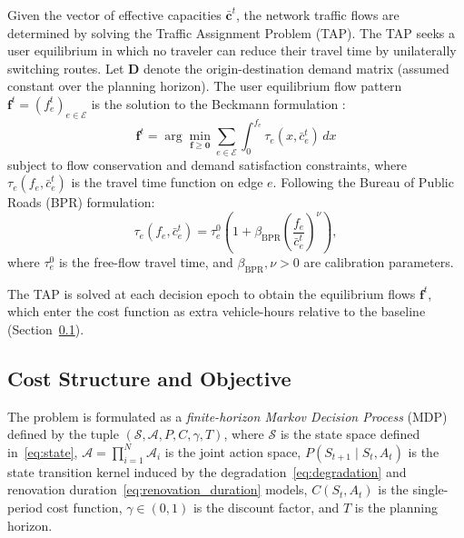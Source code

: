 \documentclass[3p, twocolumn]{elsarticle}
\begin{document}
Given the vector of effective capacities $\bar{\mathbf{c}}^t$, the network traffic flows are determined by solving the Traffic Assignment Problem (TAP). The TAP seeks a user equilibrium in which no traveler can reduce their travel time by unilaterally switching routes. Let $\mathbf{D}$ denote the origin-destination demand matrix (assumed constant over the planning horizon). The user equilibrium flow pattern $\mathbf{f}^t = (f_e^t)_{e \in \mathcal{E}}$ is the solution to the Beckmann formulation \citep{beckmannStudiesEconomicsTransportation1956}:
\begin{equation}
    \mathbf{f}^t = \arg\min_{\mathbf{f} \geq \mathbf{0}} \sum_{e \in \mathcal{E}} \int_0^{f_e} \tau_e(x, \bar{c}_e^t) \, dx
    \label{eq:TAP}
\end{equation}
subject to flow conservation and demand satisfaction constraints, where $\tau_e(f_e, \bar{c}_e^t)$ is the travel time function on edge $e$. Following the Bureau of Public Roads (BPR) formulation:
\begin{equation}
    \tau_e(f_e, \bar{c}_e^t) = \tau_e^0 \left( 1 + \beta_{\text{BPR}} \left( \frac{f_e}{\bar{c}_e^t} \right)^\nu \right),
    \label{eq:BPR}
\end{equation}
where $\tau_e^0$ is the free-flow travel time, and $\beta_{\text{BPR}}, \nu > 0$ are calibration parameters.

The TAP is solved at each decision epoch to obtain the equilibrium flows $\mathbf{f}^t$, which enter the cost function as extra vehicle-hours relative to the baseline (Section~\ref{subsec:objective}).

\subsection{Cost Structure and Objective}
\label{subsec:objective}

The problem is formulated as a \emph{finite-horizon Markov Decision Process} (MDP) defined by the tuple $(\mathcal{S}, \mathcal{A}, P, C, \gamma, T)$, where $\mathcal{S}$ is the state space defined in~\eqref{eq:state}, $\mathcal{A} = \prod_{i=1}^{N} \mathcal{A}_i$ is the joint action space, $P(S_{t+1} \mid S_t, A_t)$ is the state transition kernel induced by the degradation~\eqref{eq:degradation} and renovation duration~\eqref{eq:renovation_duration} models, $C(S_t, A_t)$ is the single-period cost function, $\gamma \in (0, 1)$ is the discount factor, and $T$ is the planning horizon.
\end{document}

